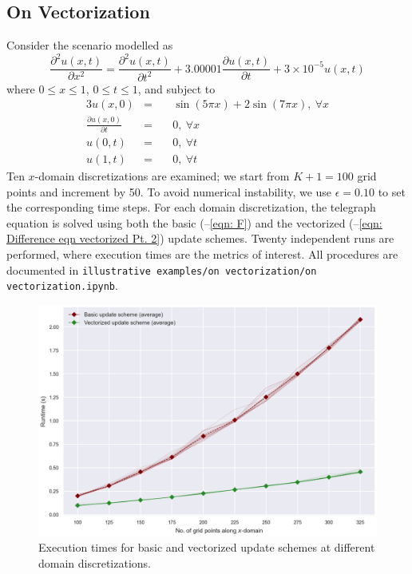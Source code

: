 \documentclass{article}
\begin{document}
\subsection{On Vectorization}
\label{subsec: On Vectorization}

Consider the scenario modelled as
\begin{equation}
   \label{eqn: Telegraph eqn for On Vectorization}
   \frac{\partial^{2} u \left(x,t\right)}{\partial x^{2}}
   =
   \frac{\partial^{2} u \left(x,t\right)}{\partial t^{2}}
   +
   3.00001 \frac{\partial u \left(x,t\right)}{\partial t}
   +
   3 \times 10^{-5} u \left(x,t\right)
\end{equation}
where $0 \leq x \leq 1$, $0 \leq t \leq 1$,
and subject to
\begin{alignat}{3}
   \label{eqn: mu for On Vectorization}
   u \left(x,0\right) &=\ && \sin \left(5 \pi x\right) + 2 \sin \left(7 \pi x\right),\ \forall x \\
   \label{eqn: xi for On Vectorization}
   \frac{\partial u \left(x,0\right)}{\partial t} &=\ && 0,\ \forall x \\
   \label{eqn: nu_0 for On Vectorization}
   u \left(0,t\right) &=\ && 0,\ \forall t \\
   \label{eqn: nu_X for On Vectorization}
   u \left(1,t\right) &=\ && 0,\ \forall t
\end{alignat}
Ten $x$-domain discretizations are examined;
we start from $K+1=100$ grid points and increment by 50.
To avoid numerical instability, we use $\epsilon = 0.10$ to set the corresponding time steps.
For each domain discretization, the telegraph equation is solved using both
the basic (--\ref{eqn: F})
and the vectorized (--\ref{eqn: Difference eqn vectorized Pt. 2}) update schemes.
Twenty independent runs are performed, where execution times are the metrics of interest.
All procedures are documented in
{\tt illustrative examples/on vectorization/on vectorization.ipynb}.

\begin{figure}[t!]
   \centering
   \includegraphics[scale=0.7]{on vectorization.png}
   \caption{Execution times for basic and vectorized update schemes at different domain discretizations.}
	\label{fig: On Vectorization results}
\end{figure}
\end{document}
